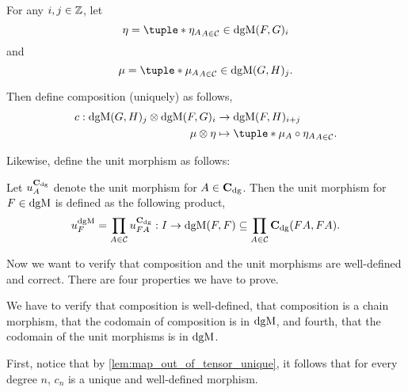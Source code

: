 \begin{remark}
    \label{rem:dgm_composition_and_unit_morphisms}
    For any \( i, j \in {\mathbb{Z}} \), let
    \[
        \eta = \tuple*{\eta_A}_{A \in \Cc} \in \dgM(F, G)_i
    \]
    and
    \[
        \mu = \tuple*{\mu_A}_{A \in \Cc} \in \dgM(G, H)_j.
    \]

    Then define composition (uniquely) as follows,
    \begin{align*}
        c: \dgM(G, H)_j \otimes \dgM(F, G)_i &\to \dgM(F, H)_{i + j} \\
        \mu \otimes \eta &\mapsto \tuple*{\mu_A \circ \eta_A}_{A \in \Cc}.
    \end{align*}

    Likewise, define the unit morphism as follows:
    
    Let \( u_A^{\operatorname{\mathbf{C}}_{\operatorname{dg}}} \) denote the unit morphism for \( A \in \operatorname{\mathbf{C}}_{\operatorname{dg}} \). Then the unit morphism for \( F \in \operatorname{dgM} \) is defined as the following product,
    \[
        u_F^{\operatorname{dgM}} = \prod_{A \in {\mathcal{C}}} u_{F A}^{\operatorname{\mathbf{C}}_{\operatorname{dg}}} : I \to \operatorname{dgM}(F, F) \subseteq \prod_{A \in {\mathcal{C}}} \operatorname{\mathbf{C}}_{\operatorname{dg}}(F A, F A).
    \]

    Now we want to verify that composition and the unit morphisms are well-defined and correct. There are four properties we have to prove.

    We have to verify that composition is well-defined, that composition is a chain morphism, that the codomain of composition is in \( \operatorname{dgM} \), and fourth, that the codomain of the unit morphisms is in \( \operatorname{dgM} \).

    First, notice that by \autoref{lem:map_out_of_tensor_unique}, it follows that for every degree \( n \), \( c_n \) is a unique and well-defined morphism.


\end{remark}
